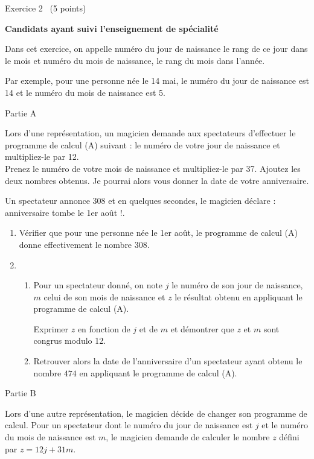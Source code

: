 
%
\begin{h2}Exercice 2  (5 points)\end{h2}
\textbf{Candidats ayant suivi l'enseignement de spécialité}
\par
Dans cet exercice, on appelle numéro du jour de naissance le rang de ce jour dans le mois et numéro du mois de naissance, le rang du mois dans l'année.
\par
Par exemple, pour une personne née le 14 mai, le numéro du jour de naissance est 14 et le numéro du mois de naissance est 5.
\begin{h3}Partie A\end{h3}
Lors d'une représentation, un magicien demande aux spectateurs d'effectuer le programme de calcul (A) suivant :
\ogPrenez le numéro de votre jour de naissance et multipliez-le par 12.
\\ Prenez le numéro de votre mois de naissance et multipliez-le par 37. Ajoutez les deux nombres obtenus. Je pourrai alors vous donner la date de votre anniversaire\fg{}.
\par
Un spectateur annonce 308 et en quelques secondes, le magicien déclare : \ogVotre anniversaire tombe le 1er août !\fg{}.
\begin{enumerate}
     \item
     Vérifier que pour une personne née le 1er août, le programme de calcul (A) donne effectivement le nombre $308$.
     \item
     \begin{enumerate}[label=\alph*.]
          \item
          Pour un spectateur donné, on note $j$ le numéro de son jour de naissance, $m$ celui de son mois de naissance et $z$ le résultat obtenu en appliquant le programme de calcul (A).
          \par
          Exprimer $z$ en fonction de $j$ et de $m$ et démontrer que $z$ et $m$ sont congrus modulo 12.
          \item
     Retrouver alors la date de l'anniversaire d'un spectateur ayant obtenu le nombre $474$ en appliquant le programme de calcul (A).\end{enumerate}
\end{enumerate}
\begin{h3}Partie B\end{h3}
Lors d'une autre représentation, le magicien décide de changer son programme de calcul. Pour un spectateur dont le numéro du jour de naissance est $j$ et le numéro du mois de naissance est $m$, le magicien demande de calculer le nombre $z$ défini par $z=12j+31m$.
